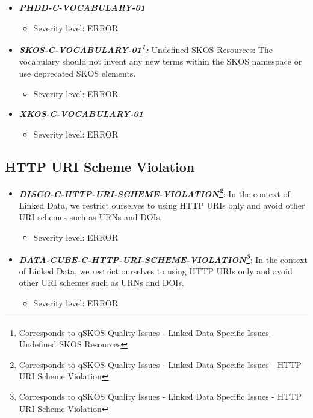 \documentclass{llncs}
\begin{document}
\begin{itemize}
	\item \textbf{\em PHDD-C-VOCABULARY-01} 
	\begin{itemize}
		\item Severity level: ERROR
	\end{itemize}
\end{itemize}

\begin{itemize}
	\item \textbf{{\em SKOS-C-VOCABULARY-01\footnote{Corresponds to qSKOS Quality Issues - Linked Data Specific Issues - Undefined SKOS Resources}:}}
	Undefined SKOS Resources:
	The vocabulary should not invent any new terms within the SKOS namespace or use deprecated SKOS elements. 
	\begin{itemize}
		\item Severity level: ERROR
	\end{itemize}
\end{itemize}

\begin{itemize}
	\item \textbf{\em XKOS-C-VOCABULARY-01} 
	\begin{itemize}
		\item Severity level: ERROR
	\end{itemize}
\end{itemize}

\subsection{HTTP URI Scheme Violation}

\begin{itemize}
	\item \textbf{\em DISCO-C-HTTP-URI-SCHEME-VIOLATION\footnote{Corresponds to qSKOS Quality Issues - Linked Data Specific Issues - HTTP URI Scheme Violation}}: 
	In the context of Linked Data, we restrict ourselves to using HTTP URIs only and avoid other URI schemes such as URNs and DOIs.
	\begin{itemize}
		\item Severity level: ERROR
	\end{itemize}
\end{itemize}

\begin{itemize}
	\item \textbf{\em DATA-CUBE-C-HTTP-URI-SCHEME-VIOLATION\footnote{Corresponds to qSKOS Quality Issues - Linked Data Specific Issues - HTTP URI Scheme Violation}}: 
	In the context of Linked Data, we restrict ourselves to using HTTP URIs only and avoid other URI schemes such as URNs and DOIs.
	\begin{itemize}
		\item Severity level: ERROR
	\end{itemize}
\end{itemize}
\end{document}
